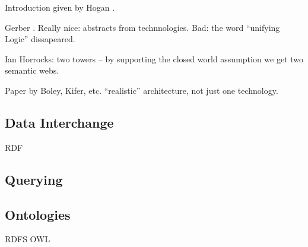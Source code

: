% 
% 


Introduction given by Hogan \cite{hogan}.



Gerber \cite{Gerber} \cite{Gerber2}. Really nice: abstracts from technnologies. Bad: the word ``unifying Logic'' dissapeared.

Ian Horrocks: two towers \cite{twotowers} -- by supporting the closed world assumption we get two semantic webs.


\cite{rearch} Paper by Boley, Kifer, etc. ``realistic'' architecture, not just one technology. 


\subsection{Data Interchange}
RDF

\cite{rdf}
\subsection{Querying}
\subsection{Ontologies}
RDFS
OWL

